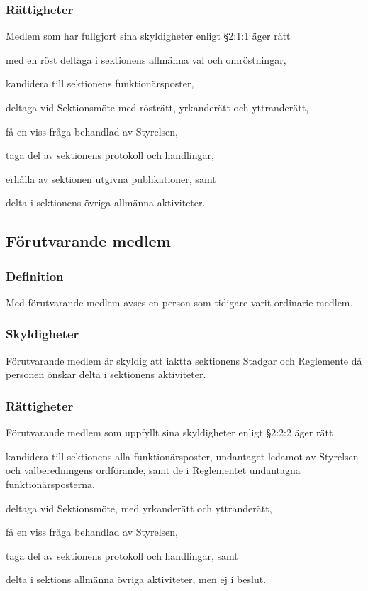 \documentclass[10pt]{article}
\begin{document}
    \subsubsection{Rättigheter}
    Medlem som har fullgjort sina skyldigheter enligt
    §2:1:1 äger rätt
    
    \begin{attlist}
    \item med en röst deltaga i sektionens allmänna val och omröstningar,
    \item kandidera till sektionens funktionärsposter,
    \item deltaga vid Sektionsmöte med rösträtt, yrkanderätt och yttranderätt,
    \item få en viss fråga behandlad av Styrelsen,
    \item taga del av sektionens protokoll och handlingar,
    \item erhålla av sektionen utgivna publikationer, samt
    \item delta i sektionens övriga allmänna aktiviteter.
    \end{attlist}
    
    
    \subsection{Förutvarande medlem}
    \subsubsection{Definition}
    Med förutvarande medlem avses en person som tidigare varit ordinarie medlem.
    
    \subsubsection{Skyldigheter}
    Förutvarande medlem är skyldig att iaktta sektionens Stadgar och Reglemente
    då personen önskar delta i sektionens aktiviteter.
    
    \subsubsection{Rättigheter}
    Förutvarande medlem som uppfyllt sina skyldigheter
    enligt §2:2:2 äger rätt
    \begin{attlist}
    \item kandidera till sektionens alla funktionärsposter, undantaget ledamot av
        Styrelsen och valberedningens ordförande, samt de i
        Reglementet undantagna funktionärsposterna.
    \item deltaga vid Sektionsmöte, med yrkanderätt och yttranderätt,
    \item få en viss fråga behandlad av Styrelsen,
    \item taga del av sektionens protokoll och handlingar, samt
    \item delta i sektions allmänna övriga aktiviteter, men ej i beslut.
    \end{attlist}
    
\end{document}
